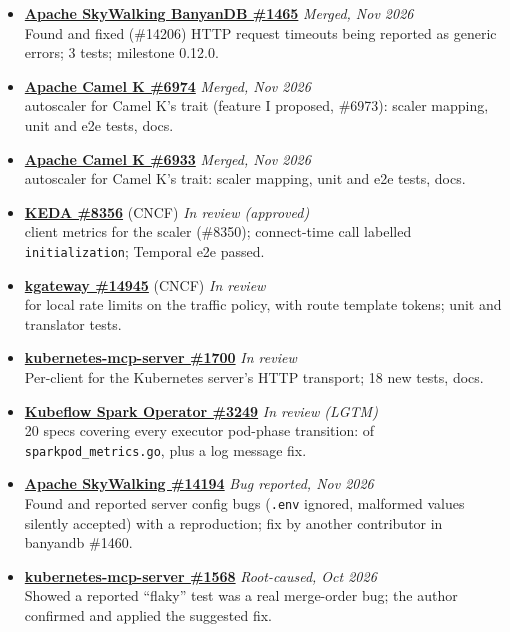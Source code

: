 \begin{itemize}[leftmargin=*, itemsep=0.3em, topsep=0.1em]
    Found and fixed (\#14199, assigned to me) case-sensitive  auth in the  HTTP server; 4 tests; milestone 0.12.0.
  \item \textbf{\href{https://github.com/apache/skywalking-banyandb/pull/1465}{Apache SkyWalking BanyanDB \#1465}} \hfill \textit{Merged, Nov 2026}\\
    Found and fixed (\#14206)  HTTP request timeouts being reported as generic errors; 3 tests; milestone 0.12.0.
  \item \textbf{\href{https://github.com/apache/camel-k/pull/6974}{Apache Camel K \#6974}} \hfill \textit{Merged, Nov 2026}\\
     autoscaler for Camel K's  trait (feature I proposed, \#6973): scaler mapping, unit and e2e tests, docs.
  \item \textbf{\href{https://github.com/apache/camel-k/pull/6933}{Apache Camel K \#6933}} \hfill \textit{Merged, Nov 2026}\\
     autoscaler for Camel K's  trait: scaler mapping, unit and e2e tests, docs.
  \item \textbf{\href{https://github.com/kedacore/keda/pull/8356}{KEDA \#8356}} (CNCF) \hfill \textit{In review (approved)}\\
     client metrics for the  scaler (\#8350); connect-time call labelled \texttt{initialization}; Temporal e2e passed.
  \item \textbf{\href{https://github.com/kgateway-dev/kgateway/pull/14945}{kgateway \#14945}} (CNCF) \hfill \textit{In review}\\
     for local rate limits on the traffic policy, with route template tokens; unit and translator tests.
  \item \textbf{\href{https://github.com/containers/kubernetes-mcp-server/pull/1700}{kubernetes-mcp-server \#1700}} \hfill \textit{In review}\\
    Per-client  for the Kubernetes  server's HTTP transport; 18 new tests, docs.
  \item \textbf{\href{https://github.com/kubeflow/spark-operator/pull/3249}{Kubeflow Spark Operator \#3249}} \hfill \textit{In review (LGTM)}\\
    20  specs covering every executor pod-phase transition:  of \texttt{sparkpod\_metrics.go}, plus a log message fix.
  \item \textbf{\href{https://github.com/apache/skywalking/issues/14194}{Apache SkyWalking \#14194}} \hfill \textit{Bug reported, Nov 2026}\\
    Found and reported  server config bugs (\texttt{.env} ignored, malformed values silently accepted) with a reproduction; fix by another contributor in banyandb \#1460.
  \item \textbf{\href{https://github.com/containers/kubernetes-mcp-server/issues/1568}{kubernetes-mcp-server \#1568}} \hfill \textit{Root-caused, Oct 2026}\\
    Showed a reported ``flaky'' test was a real merge-order bug; the author confirmed and applied the suggested fix.
\end{itemize}
